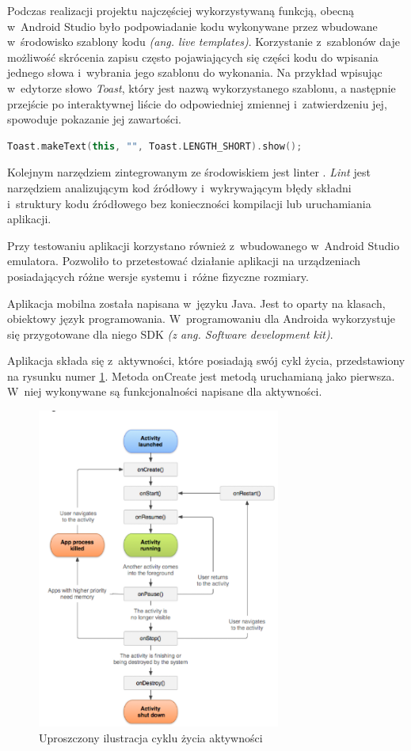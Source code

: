 \documentclass[a4paper,12pt, twoside]{article}
\begin{document}
        Podczas realizacji projektu najczęściej wykorzystywaną funkcją, obecną w~Android Studio było podpowiadanie kodu wykonywane przez wbudowane w~środowisko szablony kodu \textit{(ang. live templates)}. Korzystanie z~szablonów daje możliwość skrócenia zapisu często pojawiających się części kodu do wpisania jednego słowa i~wybrania jego szablonu do wykonania. Na przykład wpisując w~edytorze słowo \textit{Toast}, który jest nazwą wykorzystanego szablonu, a następnie przejście po interaktywnej liście do odpowiedniej zmiennej i~zatwierdzeniu jej, spowoduje pokazanie jej zawartości. 
    
    \begin{lstlisting}[language=C++, caption=Zawartość szablonu Toast]
Toast.makeText(this, "", Toast.LENGTH_SHORT).show();\end{lstlisting}
    
        Kolejnym narzędziem zintegrowanym ze środowiskiem jest linter \cite{lint}. \textit{Lint} jest narzędziem analizującym kod źródłowy i~wykrywającym błędy składni i~struktury kodu źródłowego bez konieczności kompilacji lub uruchamiania aplikacji.
    
        Przy testowaniu aplikacji korzystano również z~wbudowanego w~Android Studio emulatora. Pozwoliło to przetestować działanie aplikacji na urządzeniach posiadających różne wersje systemu i~różne fizyczne rozmiary. 

    	Aplikacja mobilna została napisana w~języku Java. Jest to oparty na klasach, obiektowy język programowania. W~programowaniu dla Androida wykorzystuje się przygotowane dla niego SDK\textit{ (z ang. Software development kit)}\cite{sdk}.
    	
    	Aplikacja składa się z~aktywności, które posiadają swój cykl życia, przedstawiony na rysunku numer \ref{fig:lifecycle}. Metoda onCreate jest metodą uruchamianą jako pierwsza. W~niej wykonywane są funkcjonalności napisane dla aktywności.
    
    	\begin{figure}[H]
    	        \centering
    			\includegraphics[width=8cm]{images/rys6_androidlifecycle.png}
    			\caption{Uproszczony ilustracja cyklu życia aktywności \cite{lifecycle}}
                \label{fig:lifecycle}
    	\end{figure}
    	
\end{document}
